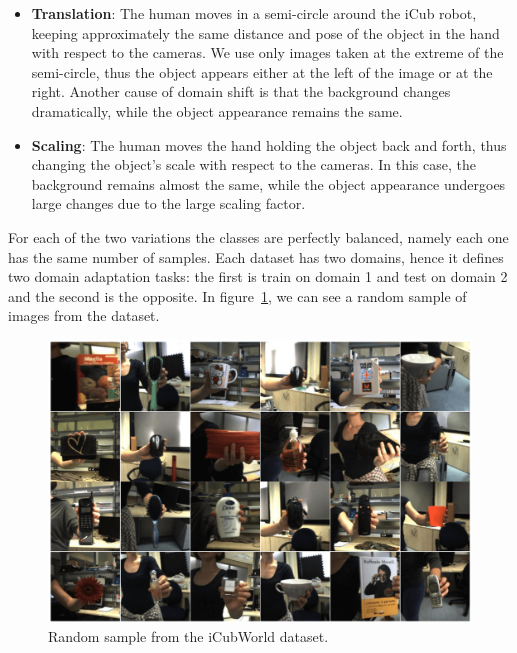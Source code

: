 \documentclass[../main.tex]{subfiles}
\begin{document}
    \begin{itemize}
        \item \textbf{Translation}: The human moves in a semi-circle around the iCub robot, keeping approximately the same
            distance and pose of the object in the hand with respect to the cameras. We use only images taken at the extreme of the
            semi-circle, thus the object appears either at the left of the image or at the right. Another cause of domain shift is
            that the background changes dramatically, while the object appearance remains the same.
        \item \textbf{Scaling}: The human moves the hand holding the object back and forth, thus changing the object's
            scale with respect to the cameras. In this case, the background remains almost the same, while the object
            appearance undergoes large changes due to the large scaling factor.
    \end{itemize}

    For each of the two variations the classes are perfectly balanced, namely each one has the same number of samples. Each dataset
    has two domains, hence it defines two domain adaptation tasks: the first is train on domain 1 and test on domain 2 and the second
    is the opposite.
    In figure~\ref{fig:icw-samples}, we can see a random sample of images from the dataset.

    \begin{figure}[h!]
        \centering{}
        \includegraphics[width=\linewidth]{./img/icw-samples.png}
        \caption{Random sample from the iCubWorld dataset.}\label{fig:icw-samples}
    \end{figure}
\end{document}
